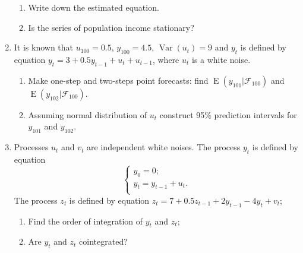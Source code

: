 \documentclass[12pt]{article}
\DeclareMathOperator{\Var}{Var}
\DeclareMathOperator{\E}{E}
\begin{document}
\begin{enumerate}
     \begin{enumerate}
       \item Write down the estimated equation. 
       \item Is the series of population income stationary?
     \end{enumerate}


  \item It is known that $u_{100} = 0.5$, $y_{100}=4.5$, $\Var(u_t)=9$ 
    and $y_t$ is defined by equation $y_t = 3 + 0.5 y_{t-1} + u_t + u_{t-1}$, where $u_t$ is a white noise.

    \begin{enumerate}
      \item Make one-step and two-steps point forecasts: find $\E(y_{101}|\mathcal{F}_{100})$ and $\E(y_{102}|\mathcal{F}_{100})$.
      \item Assuming normal distribution of $u_t$ construct 95\% prediction intervals for $y_{101}$ and $y_{102}$.
    \end{enumerate}



  \item Processes $u_t$ and $v_t$ are independent white noises. 
    The process $y_t$ is defined by equation
    \[
       \begin{cases}
	 y_0 = 0; \\
	 y_t = y_{t-1} + u_t. \\
       \end{cases}
     \]
    The process $z_t$ is defined by equation $z_t = 7 + 0.5z_{t-1} + 2y_{t-1}   -4y_t + v_t$;

    \begin{enumerate}
      \item Find the order of integration of $y_t$ and $z_t$;
      \item Are $y_t$ and $z_t$ cointegrated?
    \end{enumerate}

\end{enumerate}
\end{document}
